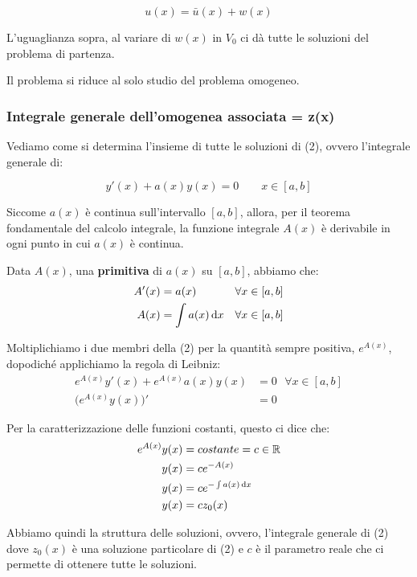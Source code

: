\[
    u(x) = \bar u(x) +w(x)
\]

L'uguaglianza sopra, al variare di \(w(x)\) in \(V_0\) ci dà tutte le soluzioni del problema di partenza.

Il problema si riduce al solo studio del problema omogeneo.

\subsubsection{Integrale generale dell'omogenea associata = z(x)}

Vediamo come si determina l'insieme di tutte le soluzioni di (2), ovvero l'integrale generale di:

\[
    y'(x)+a(x)y(x) = 0 \qquad x \in [a,b]
\]

Siccome \(a(x)\) è continua sull'intervallo \([a,b]\), allora, per il teorema fondamentale del calcolo integrale, la funzione integrale \(A(x)\) è derivabile in ogni punto in cui \(a(x)\) è continua.

Data \(A(x)\), una \textbf{primitiva} di \(a(x)\) su \([a,b]\), abbiamo che:
\medskip
\begin{align*}
    A'(x) & = a(x)              & \forall x \in [a,b] \\
    A(x)  & = \int a(x) \mathop{}\!\mathrm{d} x & \forall x \in [a,b]
\end{align*}

Moltiplichiamo i due membri della (2) per la quantità sempre positiva, \(e^{A(x)}\), dopodiché applichiamo la regola di Leibniz:
\medskip
\begin{align*}
    e^{A(x)} y'(x) + e ^{A(x)}a(x) y(x) & = 0\ \ \ \forall x \in [a,b] \\
    \bigl(e^{A(x)} y(x)\bigr)'          & = 0
\end{align*}

Per la caratterizzazione delle funzioni costanti, questo ci dice che:
\medskip
\begin{align*}
    e ^{A(x)}y(x) & = costante = c \in \mathbb{R}      \\
    y(x)          & = c e ^{-A(x)}             \\
    y(x)          & = ce^{- \int a(x) \mathop{}\!\mathrm{d} x} \\
    y(x)          & = c z_0(x)
\end{align*}

Abbiamo quindi la struttura delle soluzioni, ovvero, l'integrale generale di (2) dove \(z_0(x)\) è una soluzione particolare di (2) e \(c\) è il parametro reale che ci permette di ottenere tutte le soluzioni.

